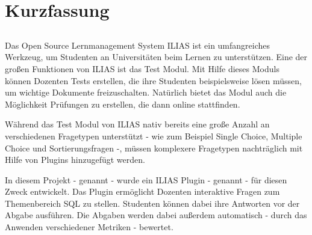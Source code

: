 \chapter*{Kurzfassung}
\section*{\thesistitle}

Das Open Source Lernmanagement System ILIAS ist ein umfangreiches Werkzeug, um Studenten an Universitäten beim Lernen zu unterstützen. Eine der großen Funktionen von ILIAS ist das Test Modul. Mit Hilfe dieses Moduls können Dozenten Tests erstellen, die ihre Studenten beispielsweise lösen müssen, um wichtige Dokumente freizuschalten. Natürlich bietet das Modul auch die Möglichkeit Prüfungen zu erstellen, die dann online stattfinden.

Während das Test Modul von ILIAS nativ bereits eine große Anzahl an verschiedenen Fragetypen unterstützt - wie zum Beispiel Single Choice, Multiple Choice und Sortierungsfragen -, müssen komplexere Fragetypen nachträglich mit Hilfe von Plugins hinzugefügt werden.

In diesem Projekt - genannt  - wurde ein ILIAS Plugin - genannt  - für diesen Zweck entwickelt. Das Plugin ermöglicht Dozenten interaktive Fragen zum Themenbereich SQL zu stellen. Studenten können dabei ihre Antworten vor der Abgabe ausführen. Die Abgaben werden dabei außerdem automatisch - durch das Anwenden verschiedener Metriken - bewertet. 
